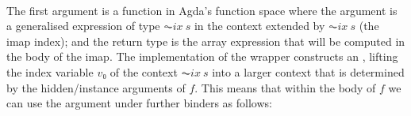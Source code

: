 \begin{code}%
%
\>[2]\AgdaSpace{}%
\AgdaSymbol{:}\AgdaSpace{}%
\AgdaSymbol{(}\AgdaSpace{}%
\AgdaSymbol{(}\AgdaSpace{}%
\AgdaSpace{}%
\AgdaSpace{}%
\AgdaSymbol{)}\AgdaSpace{}%
\AgdaSymbol{(}\AgdaSpace{}%
\AgdaSymbol{)}\AgdaSpace{}%
\AgdaSpace{}%
\AgdaSpace{}%
\AgdaSymbol{(}\AgdaSpace{}%
\AgdaSpace{}%
\AgdaSpace{}%
\AgdaSymbol{)}\AgdaSpace{}%
\AgdaSymbol{(}\AgdaSpace{}%
\AgdaSymbol{))}\AgdaSpace{}%
\AgdaSpace{}%
\AgdaSpace{}%
\AgdaSpace{}%
\AgdaSymbol{(}\AgdaSpace{}%
\AgdaSymbol{(}\AgdaSpace{}%
\AgdaSpace{}%
\AgdaSymbol{))}\<%
\\
%
\>[2]\AgdaSpace{}%
\AgdaSpace{}%
\AgdaSymbol{=}\AgdaSpace{}%
\AgdaSpace{}%
\AgdaSymbol{(}\AgdaSpace{}%
\AgdaSymbol{(}\AgdaSpace{}%
\AgdaSpace{}%
\AgdaSpace{}%
\AgdaSymbol{))}\<%
\end{code}
The first argument is a function in Agda's function space where the
argument is a generalised expression of type $\AC{ix}\ s$ in the context
extended by $\AC{ix}\ s$ (the imap index); and the return type is the array
expression that will be computed in the body of the imap.  The implementation
of the wrapper constructs an , lifting the index variable
$v₀$ of the context   $\AC{ix}\ s$ into a larger context that is determined
by the hidden/instance arguments of $f$.  This means that within the body of $f$
we can use the argument under further binders as follows:
\begin{code}%
%
\>[2]\AgdaFunction{\AgdaUnderscore{}}\AgdaSpace{}%
\AgdaSymbol{:}\AgdaSpace{}%
\AgdaSpace{}%
\AgdaSpace{}%
\AgdaSymbol{\AgdaUnderscore{}}\<%
\\
%
\>[2]\AgdaSymbol{\AgdaUnderscore{}}\AgdaSpace{}%
\AgdaSymbol{=}\AgdaSpace{}%
\AgdaSpace{}%
\AgdaSymbol{\{}\AgdaSpace{}%
\AgdaSymbol{=}\AgdaSpace{}%
\AgdaSpace{}%
\AgdaSymbol{\}}\AgdaSpace{}%
\AgdaSpace{}%
\AgdaSpace{}%
\AgdaSpace{}%
\AgdaSpace{}%
\AgdaSymbol{\{}\AgdaSpace{}%
\AgdaSymbol{=}\AgdaSpace{}%
\AgdaSpace{}%
\AgdaSymbol{\}}\AgdaSpace{}%
\AgdaSpace{}%
\AgdaSpace{}%
\AgdaSpace{}%
\AgdaSpace{}%
\AgdaSymbol{(}\AgdaSpace{}%
\AgdaSpace{}%
\AgdaSymbol{)}\AgdaSpace{}%
\<%
\end{code}
